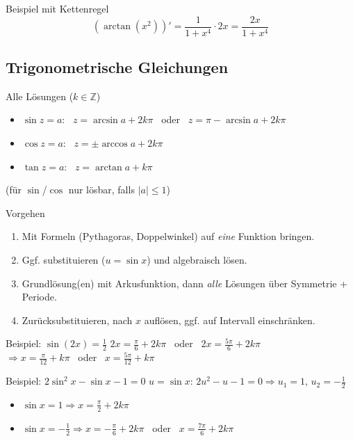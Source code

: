 \documentclass[a4paper, fontsize=7pt]{scrartcl}
\def\Z{\mathbb{Z}}  %
\renewcommand*{\arraystretch}{1.5}  %
\begin{document}
\begin{subbox}{Beispiel mit Kettenregel}
$$\left(\arctan(x^2)\right)' = \frac{1}{1 + x^4} \cdot 2x = \frac{2x}{1 + x^4}$$
\end{subbox}

\subsection{Trigonometrische Gleichungen}

\begin{mainbox}{Alle Lösungen ($k \in \Z$)}
\renewcommand*{\arraystretch}{1.5}
\begin{itemize}
    \item $\sin z = a$: \ $z = \arcsin a + 2k\pi$ \ oder \ $z = \pi - \arcsin a + 2k\pi$
    \item $\cos z = a$: \ $z = \pm \arccos a + 2k\pi$
    \item $\tan z = a$: \ $z = \arctan a + k\pi$
\end{itemize}
(für $\sin$/$\cos$ nur lösbar, falls $|a| \leq 1$)
\end{mainbox}

\begin{subbox}{Vorgehen}
\begin{enumerate}
    \item Mit Formeln (Pythagoras, Doppelwinkel) auf \emph{eine} Funktion bringen.
    \item Ggf. substituieren ($u = \sin x$) und algebraisch lösen.
    \item Grundlösung(en) mit Arkusfunktion, dann \emph{alle} Lösungen über
          Symmetrie + Periode.
    \item Zurücksubstituieren, nach $x$ auflösen, ggf. auf Intervall einschränken.
\end{enumerate}
\end{subbox}

\begin{subbox}{Beispiel: $\sin(2x) = \frac{1}{2}$}
$2x = \frac{\pi}{6} + 2k\pi$ \ oder \ $2x = \frac{5\pi}{6} + 2k\pi$\\
$\Rightarrow x = \frac{\pi}{12} + k\pi$ \ oder \ $x = \frac{5\pi}{12} + k\pi$
\end{subbox}

\begin{subbox}{Beispiel: $2\sin^2 x - \sin x - 1 = 0$}
$u = \sin x$: $2u^2 - u - 1 = 0 \Rightarrow u_1 = 1$, $u_2 = -\frac{1}{2}$
\begin{itemize}
    \item $\sin x = 1 \Rightarrow x = \frac{\pi}{2} + 2k\pi$
    \item $\sin x = -\frac{1}{2} \Rightarrow x = -\frac{\pi}{6} + 2k\pi$ \ oder \
          $x = \frac{7\pi}{6} + 2k\pi$
\end{itemize}
\end{subbox}
\end{document}
